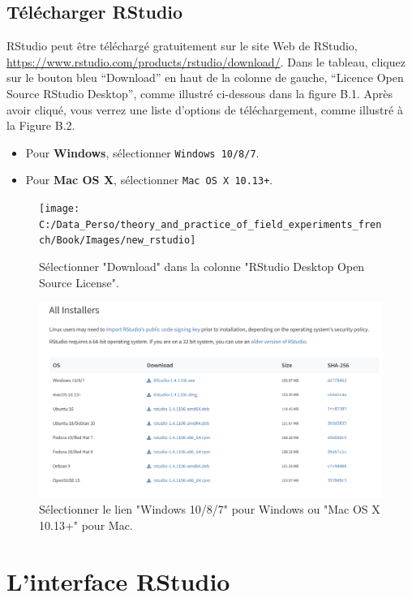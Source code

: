 \documentclass[
  12pt,
]{book}
\providecommand{\tightlist}{%
  \setlength{\itemsep}{0pt}\setlength{\parskip}{0pt}}
\begin{document}
\hypertarget{tuxe9luxe9charger-rstudio}{%
\subsection{Télécharger RStudio}\label{tuxe9luxe9charger-rstudio}}

RStudio peut être téléchargé gratuitement sur le site Web de RStudio, \url{https://www.rstudio.com/products/rstudio/download/}. Dans le tableau, cliquez sur le bouton bleu ``Download'' en haut de la colonne de gauche, ``Licence Open Source RStudio Desktop'', comme illustré ci-dessous dans la figure B.1. Après avoir cliqué, vous verrez une liste d'options de téléchargement, comme illustré à la Figure B.2.

\begin{itemize}
\tightlist
\item
  Pour \textbf{Windows}, sélectionner \texttt{Windows\ 10/8/7}.
\item
  Pour \textbf{Mac OS X}, sélectionner \texttt{Mac\ OS\ X\ 10.13+}.
\end{itemize}

\begin{figure}
\texttt{[image: C:/Data\_Perso/theory\_and\_practice\_of\_field\_experiments\_french/Book/Images/new\_rstudio]} \caption{Sélectionner "Download" dans la colonne "RStudio Desktop Open Source License".}\label{fig:rstudiopng}
\end{figure}

\begin{figure}
\includegraphics[width=0.8\linewidth]{Images/rstudio_download} \caption{Sélectionner le lien "Windows 10/8/7" pour Windows ou "Mac OS X 10.13+" pour Mac.}\label{fig:rstudiodownload}
\end{figure}

\hypertarget{linterface-rstudio}{%
\section{L'interface RStudio}\label{linterface-rstudio}}
\end{document}
